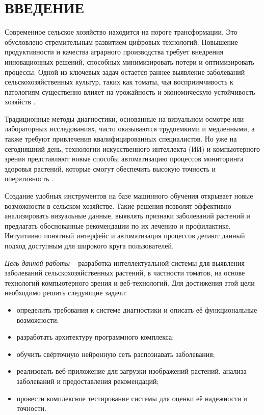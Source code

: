 \section*{ВВЕДЕНИЕ}

Современное сельское хозяйство находится на пороге трансформации. Это обусловлено стремительным развитием цифровых технологий. Повышение продуктивности и качества аграрного производства требует внедрения инновационных решений, способных минимизировать потери и оптимизировать процессы. Одной из ключевых задач остается раннее выявление заболеваний сельскохозяйственных культур, таких как томаты, чья восприимчивость к патологиям существенно влияет на урожайность и экономическую устойчивость хозяйств \cite{plant8}.

Традиционные методы диагностики, основанные на визуальном осмотре или лабораторных исследованиях, часто оказываются трудоемкими и медленными, а также требуют привлечения квалифицированных специалистов. Но уже на сегодняшний день, технологии искусственного интеллекта (ИИ) и компьютерного зрения представляют новые способы автоматизацию процессов мониторинга здоровья растений, которые смогут обеспечить высокую точность и оперативность \cite{sh1}.

Создание удобных инструментов на базе машинного обучения открывает новые возможности в сельском хозяйстве. Такие решения позволят эффективно анализировать визуальные данные, выявлять признаки заболеваний растений и предлагать обоснованные рекомендации по их лечению и профилактике. Интуитивно понятный интерфейс и автоматизация процессов делают данный подход доступным для широкого круга пользователей.

\emph{Цель данной работы} -- разработка интеллектуальной системы для выявления заболеваний сельскохозяйственных растений, в частности томатов, на основе технологий компьютерного зрения и веб-технологий. Для достижения этой цели необходимо решить следующие задачи:

\begin{itemize}
	\item определить требования к системе диагностики и описать её функциональные возможности;
	\item разработать архитектуру программного комплекса;
	\item обучить свёрточную нейронную сеть распознавать заболевания;
	\item реализовать веб-приложение для загрузки изображений растений, анализа заболеваний и предоставления рекомендаций;
	\item провести комплексное тестирование системы для оценки её надежности и точности.
\end{itemize}

